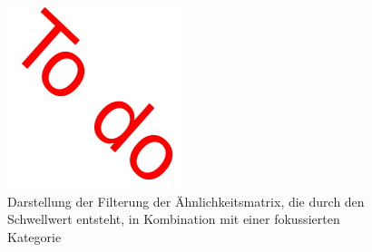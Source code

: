 \begin{figure}
    \begin{tikzpicture}
    \end{tikzpicture}
    \includegraphics{images/todobild}
    \caption{Darstellung der Filterung der Ähnlichkeitsmatrix, die durch den Schwellwert entsteht, in Kombination mit einer fokussierten Kategorie}
    \label{fig:simM-threshold-focus-cat}
\end{figure}



















